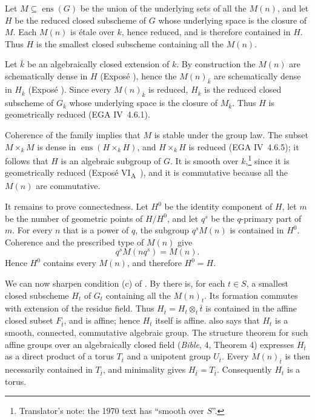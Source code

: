 Let \(M\subseteq\operatorname{ens}(G)\) be the union of the underlying
sets of all the \(M(n)\), and let \(H\) be the reduced closed
subscheme of \(G\) whose underlying space is the closure of \(M\).
Each \(M(n)\) is étale over \(k\), hence reduced, and is therefore
contained in \(H\). Thus \(H\) is the smallest closed subscheme
containing all the \(M(n)\).

Let \(\bar k\) be an algebraically closed extension of \(k\). By
construction the \(M(n)\) are schematically dense in \(H\) (Exposé
), hence the \(M(n)_{\bar k}\) are schematically dense in
\(H_{\bar k}\) (Exposé ). Since every \(M(n)_{\bar k}\) is
reduced, \(H_{\bar k}\) is the reduced closed subscheme of
\(G_{\bar k}\) whose underlying space is the closure of \(M_{\bar k}\).
Thus \(H\) is geometrically reduced (EGA IV~4.6.1).

Coherence of the family implies that \(M\) is stable under the group
law. The subset \(M\times_kM\) is dense in
\(\operatorname{ens}(H\times_kH)\), and \(H\times_kH\) is reduced
(EGA IV~4.6.5); it follows that \(H\) is an algebraic subgroup of
\(G\). It is smooth over \(k\),\footnote{Translator's note: the 1970 text has ``smooth over \(S\)''.} since it is geometrically reduced
(Exposé VI\textsubscript{A}~), and it is commutative because all
the \(M(n)\) are commutative.

It remains to prove connectedness. Let \(H^0\) be the identity
component of \(H\), let \(m\) be the number of geometric points of
\(H/H^0\), and let \(q^s\) be the \(q\)-primary part of \(m\). For
every \(n\) that is a power of \(q\), the subgroup
\(q^sM(n)\) is contained in \(H^0\). Coherence and the prescribed
type of \(M(n)\) give
\[
  q^sM(nq^s)=M(n).
\]
Hence \(H^0\) contains every \(M(n)\), and therefore \(H^0=H\).

We can now sharpen condition (c) of . By  there
is, for each \(t\in S\), a smallest closed subscheme \(H_t\) of
\(G_t\) containing all the \(M(n)_t\). Its formation commutes with
extension of the residue field. Thus \(H_{\bar t}=H_t\otimes_t\bar t\) is
contained in the affine closed subset \(F_{\bar t}\), and is affine; hence
\(H_t\) itself is affine.  also says that \(H_t\) is a
smooth, connected, commutative algebraic group. The structure theorem
for such affine groups over an algebraically closed field
(\emph{Bible}, 4, Theorem 4) expresses \(H_{\bar t}\) as a direct product of
a torus \(T_{\bar t}\) and a unipotent group \(U_{\bar t}\). Every \(M(n)_{\bar t}\)
is then necessarily contained in \(T_{\bar t}\), and minimality gives \(H_{\bar t}=T_{\bar t}\). Consequently
\(H_t\) is a torus.

